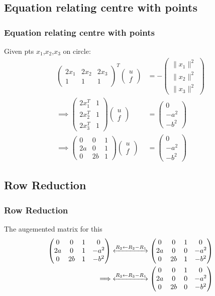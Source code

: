 \documentclass{beamer}
\theoremstyle{remark}
\providecommand{\norm}[1]{\lVert#1\rVert}
\newcommand{\myvec}[1]{\ensuremath{\begin{pmatrix}#1\end{pmatrix}}}
\numberwithin{equation}{section}
\begin{document}
\subsection{Equation relating centre with points}
\begin{frame}
\frametitle{Equation relating centre with points}
Given pts $x_1$,$x_2$,$x_3$ on circle:
\begin{align}
    \myvec{2x_1&2x_2&2x_3\\1&1&1}^T\myvec{u\\f}&=-\myvec{\norm{x_1}^2\\\norm{x_2}^2\\\norm{x_3}^2}\\
    \implies\myvec{2x_1^T&1\\2x_2^T&1\\2x_3^T&1}\myvec{u\\f}&=\myvec{0\\-a^2\\-b^2}\\
    \implies\myvec{0&0&1\\2a&0&1\\0&2b&1}\myvec{u\\f}&=\myvec{0\\-a^2\\-b^2}
\end{align}
\end{frame}
\subsection{Row Reduction}
\begin{frame}
\frametitle{Row Reduction}
The augemented matrix for this
\begin{align}
    \myvec{0&0&1&0\\2a&0&1&-a^2\\0&2b&1&-b^2}\xleftrightarrow[]{R_2 \leftarrow {R_2-R_1}}\myvec{0&0&1&0\\2a&0&0&-a^2\\0&2b&1&-b^2}\\
    \implies\xleftrightarrow[]{R_3 \leftarrow {R_3-R_1}}\myvec{0&0&1&0\\2a&0&0&-a^2\\0&2b&0&-b^2}
\end{align}
\end{frame}
\end{document}
